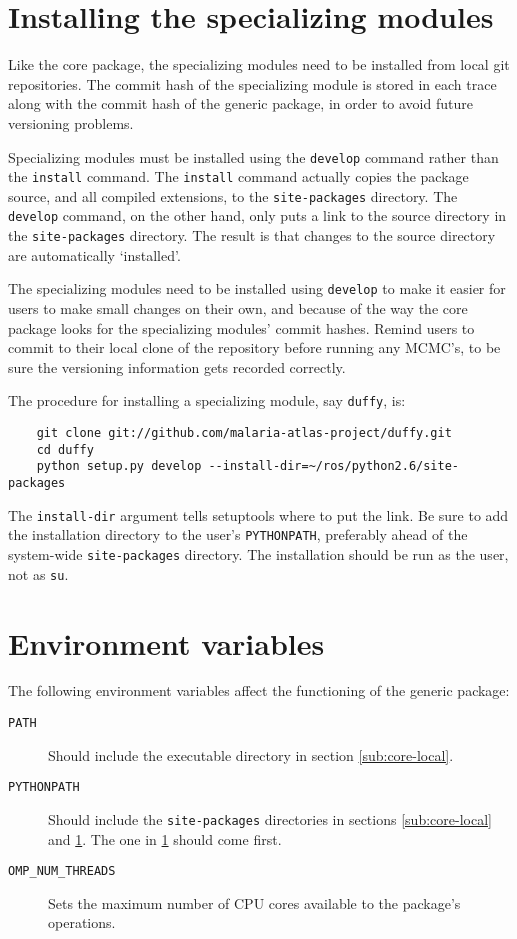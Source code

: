 \section{Installing the specializing modules}
\label{sec:spec-local} 
Like the core package, the specializing modules need to be installed from local git repositories. The commit hash of the specializing module is stored in each trace along with the commit hash of the generic package, in order to avoid future versioning problems.

\medskip
Specializing modules must be installed using the \texttt{develop} command rather than the \texttt{install} command. The \texttt{install} command actually copies the package source, and all compiled extensions, to the \texttt{site-packages} directory. The \texttt{develop} command, on the other hand, only puts a link to the source directory in the \texttt{site-packages} directory. The result is that changes to the source directory are automatically `installed'.

The specializing modules need to be installed using \texttt{develop} to make it easier for users to make small changes on their own, and because of the way the core package looks for the specializing modules' commit hashes. Remind users to commit to their local clone of the repository before running any MCMC's, to be sure the versioning information gets recorded correctly.

The procedure for installing a specializing module, say \texttt{duffy}, is:
\begin{verbatim}
    git clone git://github.com/malaria-atlas-project/duffy.git
    cd duffy
    python setup.py develop --install-dir=~/ros/python2.6/site-packages
\end{verbatim}
The \texttt{install-dir} argument tells setuptools where to put the link. Be sure to add the installation directory to the user's \texttt{PYTHONPATH}, preferably ahead of the system-wide \texttt{site-packages} directory. The installation should be run as the user, not as \texttt{su}.

\section{Environment variables}
The following environment variables affect the functioning of the generic package:
\begin{description}
    \item[\texttt{PATH}] Should include the executable directory in section \ref{sub:core-local}.
    \item[\texttt{PYTHONPATH}] Should include the \texttt{site-packages} directories in sections \ref{sub:core-local} and \ref{sec:spec-local}. The one in \ref{sec:spec-local} should come first.
    \item[\texttt{OMP\_NUM\_THREADS}] Sets the maximum number of CPU cores available to the package's operations. 
\end{description}

